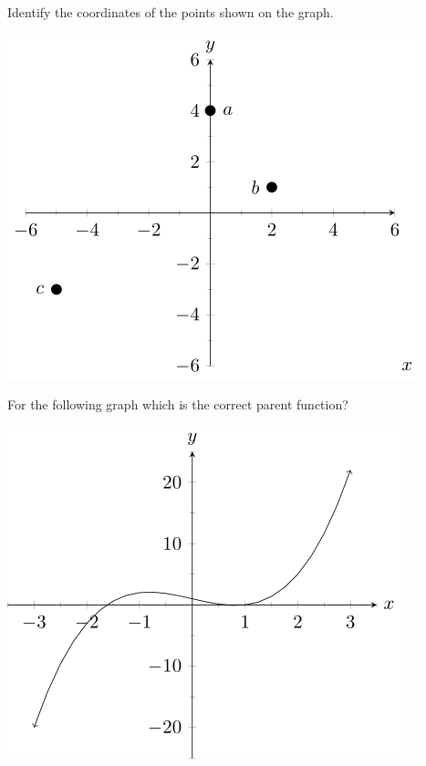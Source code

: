\documentclass{ximera}
\begin{document}
\begin{problem}
    Identify the coordinates of the points shown on the graph.
    \begin{center}
        \includegraphics{./Picture22.png}
    \end{center}
    \begin{multipleChoice}
    \end{multipleChoice}
\end{problem}



\begin{problem}
    For the following graph which is the correct parent function?
    \begin{center}
        \includegraphics{./Picture23.png}
    \end{center}

    \begin{multipleChoice}
    \end{multipleChoice}
\end{problem}
\end{document}
